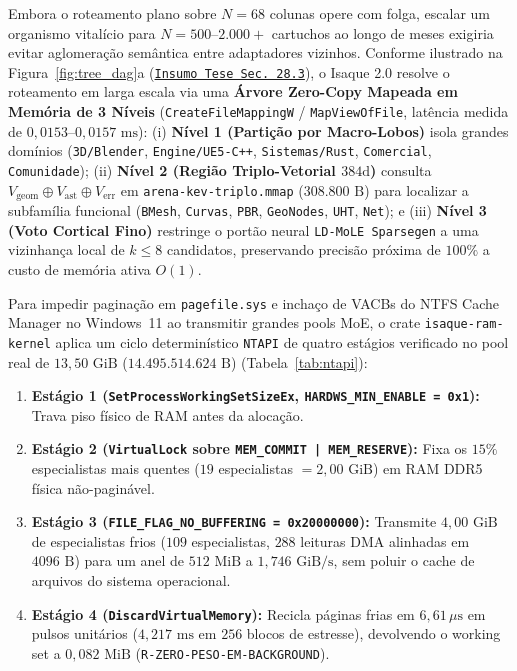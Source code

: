 \documentclass[10pt,a4paper]{article}
\begin{document}
Embora o roteamento plano sobre $N=68$ colunas opere com folga, escalar um organismo vital\'icio para $N = 500\text{--}2.000+$ cartuchos ao longo de meses exigiria evitar aglomera\c{c}\~ao sem\^antica entre adaptadores vizinhos. Conforme ilustrado na Figura~\ref{fig:tree_dag}a (\href{https://drive.google.com/file/d/1-i60d5UqJBOJQYLSr-ErZxecFeYSi4zX/view?usp=drivesdk}{\texttt{Insumo Tese Sec.\ 28.3}}), o Isaque 2.0 resolve o roteamento em larga escala via uma \textbf{\'Arvore Zero-Copy Mapeada em Mem\'oria de 3 N\'iveis} (\texttt{CreateFileMappingW} / \texttt{MapViewOfFile}, lat\^encia medida de \textbf{$0,0153\text{--}0,0157\text{ ms}$}): (i) \textbf{N\'ivel 1 (Parti\c{c}\~ao por Macro-Lobos)} isola grandes dom\'inios (\texttt{3D/Blender}, \texttt{Engine/UE5-C++}, \texttt{Sistemas/Rust}, \texttt{Comercial}, \texttt{Comunidade}); (ii) \textbf{N\'ivel 2 (Regi\~ao Triplo-Vetorial $384\text{d}$)} consulta $V_{\text{geom}} \oplus V_{\text{ast}} \oplus V_{\text{err}}$ em \texttt{arena-kev-triplo.mmap} ($308.800\text{ B}$) para localizar a subfam\'ilia funcional (\texttt{BMesh}, \texttt{Curvas}, \texttt{PBR}, \texttt{GeoNodes}, \texttt{UHT}, \texttt{Net}); e (iii) \textbf{N\'ivel 3 (Voto Cortical Fino)} restringe o port\~ao neural \texttt{LD-MoLE Sparsegen} a uma vizinhan\c{c}a local de $k \le 8$ candidatos, preservando precis\~ao pr\'oxima de $100\%$ a custo de mem\'oria ativa $O(1)$.

Para impedir pagina\c{c}\~ao em \texttt{pagefile.sys} e incha\c{c}o de VACBs do NTFS Cache Manager no Windows~11 ao transmitir grandes pools MoE, o crate \texttt{isaque-ram-kernel} aplica um ciclo determin\'istico \texttt{NTAPI} de quatro est\'agios verificado no pool real de $13,50\text{ GiB}$ ($14.495.514.624\text{ B}$) (Tabela~\ref{tab:ntapi}):
\begin{enumerate}
  \item \textbf{Est\'agio 1 (\texttt{SetProcessWorkingSetSizeEx}, \texttt{HARDWS\_\allowbreak{}MIN\_\allowbreak{}ENABLE = 0x1}):} Trava piso f\'isico de RAM antes da aloca\c{c}\~ao.
  \item \textbf{Est\'agio 2 (\texttt{VirtualLock} sobre \texttt{MEM\_\allowbreak{}COMMIT | MEM\_\allowbreak{}RESERVE}):} Fixa os $15\%$ especialistas mais quentes ($19$ especialistas $= 2,00\text{ GiB}$) em RAM DDR5 f\'isica n\~ao-pagin\'avel.
  \item \textbf{Est\'agio 3 (\texttt{FILE\_\allowbreak{}FLAG\_\allowbreak{}NO\_\allowbreak{}BUFFERING = 0x20000000}):} Transmite $4,00\text{ GiB}$ de especialistas frios ($109$ especialistas, $288$ leituras DMA alinhadas em $4096\text{ B}$) para um anel de $512\text{ MiB}$ a \textbf{$1,746\text{ GiB/s}$}, sem poluir o cache de arquivos do sistema operacional.
  \item \textbf{Est\'agio 4 (\texttt{DiscardVirtualMemory}):} Recicla p\'aginas frias em \textbf{$6,61\,\mu\text{s}$} em pulsos unit\'arios ($4,217\text{ ms}$ em $256$ blocos de estresse), devolvendo o working set a $0,082\text{ MiB}$ (\texttt{R-ZERO-PESO-EM-BACKGROUND}).
\end{enumerate}
\end{document}
